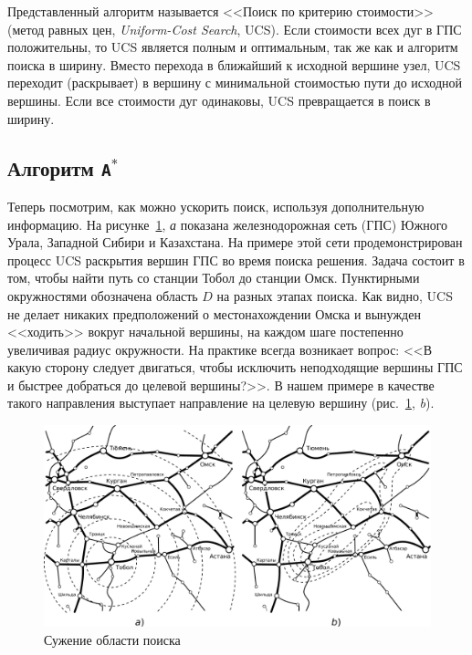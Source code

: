 \documentclass[a4paper,14pt, openany, twoside, final]{extbook} %
\newcommand{\eeng}[1]{\emph{\foreignlanguage{english}{#1}}}
\begin{document}
Представленный алгоритм называется <<Поиск по критерию стоимости>> (метод равных цен, \eeng{Uniform-Cost Search}, UCS).  Если стоимости всех дуг в ГПС положительны, то UCS является полным и оптимальным, так же как и алгоритм поиска в ширину.  Вместо перехода в ближайший к исходной вершине узел, UCS переходит (раскрывает) в вершину с минимальной стоимостью пути до исходной вершины.  Если все стоимости дуг одинаковы, UCS превращается в поиск в ширину.

\subsection{Алгоритм \texttt{A}${}^\mathtt{*}$}

Теперь посмотрим, как можно ускорить поиск, используя дополнительную информацию.  На рисунке~\ref{fig:contraction}, \emph{а} показана железнодорожная сеть (ГПС) Южного Урала, Западной Сибири и Казахстана.  На примере этой сети продемонстрирован процесс UCS раскрытия вершин ГПС во время поиска решения.  Задача состоит в том, чтобы найти путь со станции Тобол до станции Омск.   Пунктирными окружностями обозначена область $D$ на разных этапах поиска.  Как видно, UCS не делает никаких предположений о местонахождении Омска и вынужден <<ходить>> вокруг начальной вершины, на каждом шаге постепенно увеличивая радиус окружности.  На практике всегда возникает вопрос: <<В какую сторону следует двигаться, чтобы исключить неподходящие вершины ГПС и быстрее добраться до целевой вершины?>>.  В нашем примере в качестве такого направления выступает направление на целевую вершину (рис.~\ref{fig:contraction}, \emph{b}).
\begin{figure}[bht]
  \centering
  \includegraphics[width=\columnwidth]{yuzd1.pdf}
  \caption{Сужение области поиска}\label{fig:contraction}
\end{figure}
\end{document}

